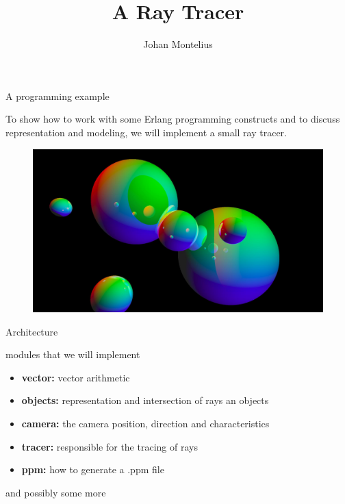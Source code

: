 

\title[ID1019 Ray Tracer]{A Ray Tracer}
 
 
\author{Johan Montelius}
\date{\semester}



\begin{frame}
\titlepage
\end{frame}

\begin{frame}{A programming example}

To show how to work with some Erlang programming constructs and to
discuss representation and modeling, we will implement a small ray tracer. 

\pause \vspace{20pt}

\begin{figure}
 \includegraphics[scale=0.1]{world.jpg}
\end{figure}

\end{frame}

\begin{frame}{Architecture}

modules that we will implement

\begin{itemize}
 \item {\bf vector:} vector arithmetic
 \item {\bf objects:} representation and intersection of rays an objects
 \item {\bf camera:} the camera position, direction and characteristics
 \item {\bf tracer:} responsible for the tracing of rays 
 \item {\bf ppm:} how to generate a .ppm file
\end{itemize}

\pause and possibly some more

\end{frame}

